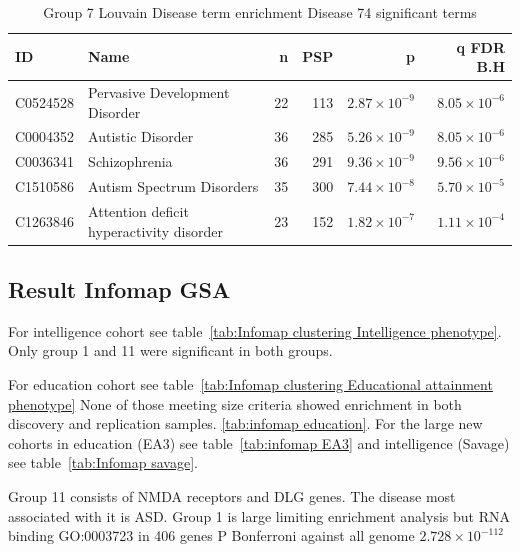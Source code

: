 \begin{table}[ht]
\centering
\begin{tabular}{llrrrr}
  \toprule
ID & Name & n &  PSP & p & q FDR B.H \\ 
  \midrule
C0524528 & Pervasive Development Disorder & 22 & 113 & $2.87 \times 10^{-9}$ & $8.05 \times 10^{-6}$ \\ 
  C0004352 & Autistic Disorder & 36 & 285 & $5.26 \times 10^{-9}$ & $8.05 \times 10^{-6}$ \\ 
  C0036341 & Schizophrenia & 36 & 291 & $9.36 \times 10^{-9}$ & $9.56 \times 10^{-6}$ \\ 
  C1510586 & Autism Spectrum Disorders & 35 & 300 & $7.44 \times 10^{-8}$ & $5.70 \times 10^{-5}$ \\ 
  C1263846 & Attention deficit hyperactivity disorder & 23 & 152 & $1.82 \times 10^{-7}$ & $1.11 \times 10^{-4}$ \\ 
   \bottomrule
\end{tabular}
\caption{Group 7 Louvain Disease term enrichment Disease 74 significant terms} 
\label{tab:Group 7 Disease 74 significant terms}
\end{table}


\clearpage
\subsection{Result Infomap GSA}
\label{sec:result infomap gsa}
For intelligence cohort see table~\ref{tab:Infomap clustering Intelligence phenotype}. Only group 1 and 11 were significant in both groups. 

For education cohort see table~\ref{tab:Infomap clustering Educational attainment phenotype} None of those meeting size criteria showed enrichment in both discovery and replication samples. \ref{tab:infomap education}. For the large new cohorts in education (EA3) see table~\ref{tab:infomap EA3} and intelligence (Savage) see table~\ref{tab:Infomap savage}.

Group 11 consists of NMDA receptors and DLG genes. The disease most associated with it is ASD. Group 1 is large limiting enrichment analysis but RNA binding GO:0003723 in 406 genes P Bonferroni against all genome $2.728 \times 10^{-112}$ 








